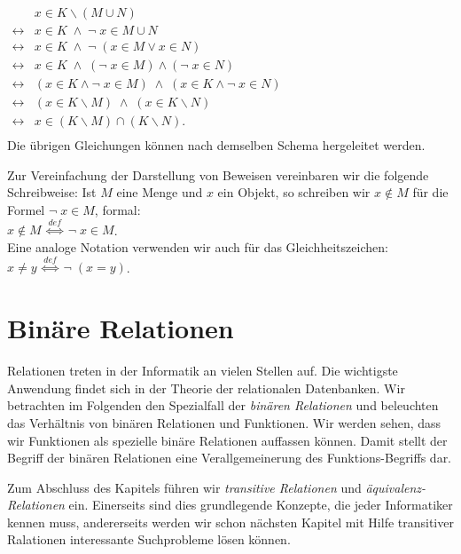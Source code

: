\hspace*{1.3cm} $
\begin{array}{ll}
                & x \in K \backslash (M \cup N)        \\
\leftrightarrow & x \in K \;\wedge\; \neg\; x \in M \cup N \\
\leftrightarrow & x \in K \;\wedge\; \neg\; (x \in M \vee x \in N) \\
\leftrightarrow & x \in K \;\wedge\;  (\neg\; x \in M) \wedge (\neg\; x \in N) \\
\leftrightarrow & (x \in K \wedge \neg\;x \in M) \;\wedge\; (x \in K \wedge \neg\;x \in N) \\
\leftrightarrow & (x \in K \backslash M) \;\wedge\; (x \in K \backslash N) \\
\leftrightarrow & x \in (K \backslash M) \cap (K \backslash N). \\
\end{array}$ \\[0.3cm]
Die \"{u}brigen Gleichungen k\"{o}nnen nach demselben Schema hergeleitet werden.

\noindent
Zur Vereinfachung der Darstellung von Beweisen vereinbaren wir die folgende Schreibweise:
Ist $M$ eine Menge und $x$ ein Objekt, so schreiben wir $x \notin M$  f\"{u}r
die Formel $\neg\; x \in M$, formal: \\[0.2cm]
\hspace*{1.3cm} $x \notin M \;\stackrel{de\!f}{\Longleftrightarrow}\; \neg\; x \in M$.
\\[0.2cm]
Eine analoge Notation verwenden wir auch f\"{u}r das Gleichheitszeichen:
\\[0.2cm]
\hspace*{1.3cm} 
$x \not= y \;\stackrel{de\!f}{\Longleftrightarrow}\; \neg\; (x = y)$.

\section{Bin\"{a}re Relationen}
Relationen treten in der Informatik an vielen Stellen auf.  Die wichtigste
Anwendung findet sich in der Theorie der relationalen Datenbanken.
Wir betrachten im Folgenden den Spezialfall der \emph{bin\"{a}ren Relationen} und beleuchten
das Verh\"{a}ltnis von bin\"{a}ren Relationen und Funktionen. Wir werden sehen, dass wir
Funktionen als spezielle bin\"{a}re Relationen auffassen k\"{o}nnen.  Damit stellt der Begriff der
bin\"{a}ren Relationen eine Verallgemeinerung des Funktions-Begriffs dar.

Zum Abschluss des Kapitels f\"{u}hren wir \emph{transitive Relationen} und
\emph{\"{a}quivalenz-Relationen} ein.  Einerseits sind dies grundlegende Konzepte, die jeder Informatiker
kennen muss, andererseits werden wir schon n\"{a}chsten Kapitel mit Hilfe transitiver Ralationen
interessante Suchprobleme l\"{o}sen k\"{o}nnen.


